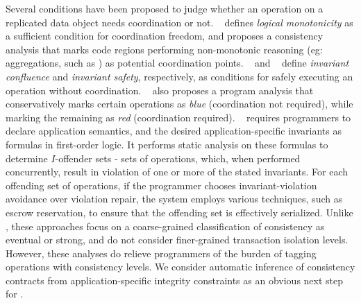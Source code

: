 Several conditions have been proposed to judge whether an operation on a
replicated data object needs coordination or not. ~\cite{Calm} defines
\emph{logical monotonicity} as a sufficient condition for coordination
freedom, and proposes a consistency analysis that marks code regions
performing non-monotonic reasoning (eg: aggregations, such as ) as
potential coordination points. ~\cite{IConfluence} and ~\cite{Sieve} define
\emph{invariant confluence} and \emph{invariant safety}, respectively, as
conditions for safely executing an operation without coordination.
~\cite{Sieve} also proposes a program analysis that conservatively marks
certain operations as \emph{blue} (coordination not required), while marking
the remaining as \emph{red} (coordination required). ~\cite{indigo} requires
programmers to declare application semantics, and the desired
application-specific invariants as formulas in first-order logic. It
performs static analysis on these formulas to determine $I$-offender sets -
sets of operations, which, when performed concurrently, result in violation
of one or more of the stated invariants. For each offending set of
operations, if the programmer chooses invariant-violation avoidance over
violation repair, the system employs various techniques, such as escrow
reservation, to ensure that the offending set is effectively
serialized. Unlike \name, these approaches focus on a coarse-grained
classification of consistency as eventual or strong, and do not consider
finer-grained transaction isolation levels. However, these analyses do
relieve programmers of the burden of tagging operations with consistency
levels. We consider automatic inference of consistency contracts from
application-specific integrity constraints as an obvious  next step for \name.
